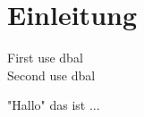 \chapter{Einleitung}
\label{ch:intro}
First use \gls{dbal}\\
Second use \gls{dbal}

\Blindtext
"Hallo" das ist ...

